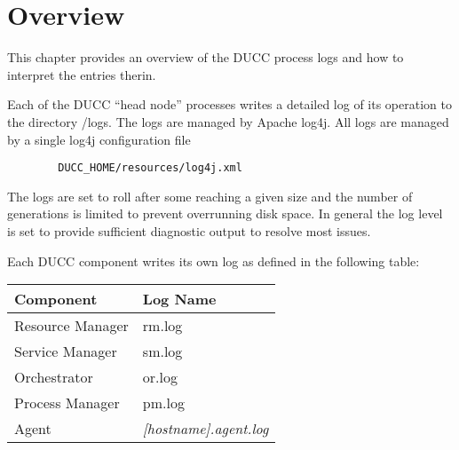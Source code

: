 % 
% 
% 
% 
 \section{Overview}

    This chapter provides an overview of the DUCC process logs and how to interpret the
    entries therin.

    Each of the DUCC ``head node'' processes writes a detailed log of its operation to
    the directory \ducchome/logs.  The logs are managed by Apache log4j.  All logs are
    managed by a single log4j configuration file
\begin{verbatim}
        DUCC_HOME/resources/log4j.xml
\end{verbatim}

    The logs are set to roll after some reaching a given size and the number of generations
    is limited to prevent overrunning disk space.  In general the log level is set to
    provide sufficient diagnostic output to resolve most issues.

    Each DUCC component writes its own log as defined in the following table:

    \begin{tabular} {| l | l |}
       \hline
          Component & Log Name \\
      \hline
      \hline
          Resource Manager & rm.log \\
      \hline
          Service Manager & sm.log \\
      \hline
          Orchestrator & or.log \\
      \hline
          Process Manager & pm.log \\
      \hline
          Agent & {\em [hostname].agent.log } \\
      \hline
    \end{tabular}
    
